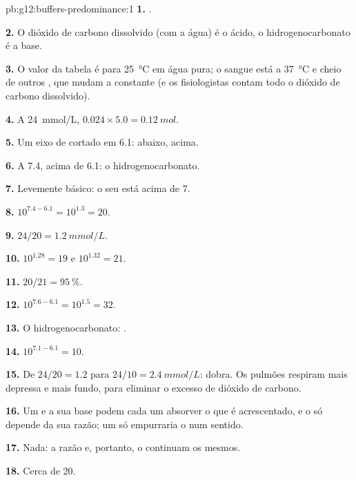 \begin{solution}{pb:g12:buffers-predominance:1}
\textbf{1.} .

\textbf{2.} O dióxido de carbono dissolvido (com a água) é o ácido, o
hidrogenocarbonato é a base.

\textbf{3.} O valor da tabela é para \qty{25}{\celsius} em água pura; o
sangue está a \qty{37}{\celsius} e cheio de outros , que mudam a
constante (e os fisiologistas contam todo o dióxido de carbono
dissolvido).

\textbf{4.} A \qty{24}{mmol/L}, $0.024 \times 5.0 = \qty{0.12}{mol}$.

\textbf{5.} Um eixo de  cortado em 6.1:  abaixo, 
acima.

\textbf{6.} A 7.4, acima de 6.1: o hidrogenocarbonato.

\textbf{7.} Levemente básico: o seu  está acima de 7.

\textbf{8.} $10^{7.4 - 6.1} = 10^{1.3} = 20$.

\textbf{9.} $24 / 20 = \qty{1.2}{mmol/L}$.

\textbf{10.} $10^{1.28} = 19$ e $10^{1.32} = 21$.

\textbf{11.} $20/21 = \qty{95}{\percent}$.

\textbf{12.} $10^{7.6 - 6.1} = 10^{1.5} = 32$.

\textbf{13.} O  hidrogenocarbonato:
.

\textbf{14.} $10^{7.1 - 6.1} = 10$.

\textbf{15.} De $24/20 = 1.2$ para $24/10 = \qty{2.4}{mmol/L}$: dobra. Os
pulmões respiram mais depressa e mais fundo, para eliminar o excesso de
dióxido de carbono.

\textbf{16.} Um  e a sua base podem cada um absorver o que é
acrescentado, e o  só depende da sua razão; um  só
empurraria o  num sentido.

\textbf{17.} Nada: a razão e, portanto, o  continuam os mesmos.

\textbf{18.} Cerca de 20.
\end{solution}
